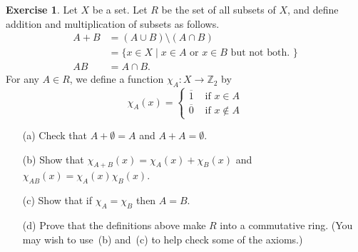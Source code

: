 \documentclass{amsart}
\newcommand{\Z}         {{\mathbb{Z}}}
\newcommand{\ov}[1]     {\overline{#1}}
\newcommand{\sm}        {\setminus}
\newcommand{\xra}       {\xrightarrow}
\newcommand{\st}        {\;|\;}
\newcommand{\ip}[1]     {\langle #1\rangle}
\renewcommand{\:}{\colon}
\theoremstyle{definition}
\newtheorem{exercise}{Exercise}[section]
\begin{document}
\begin{exercise}
 Let $X$ be a set.  Let $R$ be the set of all subsets of $X$, and
 define addition and multiplication of subsets as follows.
 \begin{align*}
  A+B &= (A\cup B)\sm(A\cap B) \\
      &= \{ x\in X \st x\in A \text{ or } x\in B 
            \text{ but not both. } \} \\
  AB  &= A\cap B.
 \end{align*}
 For any $A\in R$, we define a function $\chi_A\:X\xra{}\Z_2$ by
 \[ \chi_A(x) =
      \begin{cases}
        \ov{1} & \text{ if } x\in A \\
        \ov{0} & \text{ if } x\not\in A
      \end{cases}
 \]
 \begin{itemize}
  \item[(a)] Check that $A+\emptyset=A$ and $A+A=\emptyset$.
  \item[(b)] Show that $\chi_{A+B}(x)=\chi_A(x)+\chi_B(x)$ and
   $\chi_{AB}(x)=\chi_A(x)\chi_B(x)$.
  \item[(c)] Show that if $\chi_A=\chi_B$ then $A=B$.
  \item[(d)] Prove that the definitions above make $R$ into a
   commutative ring.  (You may wish to use~(b) and~(c) to help check
   some of the axioms.)  
 \end{itemize}
\end{exercise}
\end{document}
